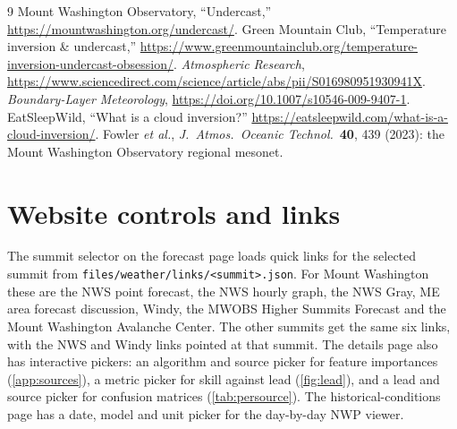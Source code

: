 \documentclass[11pt]{article}
\newcommand{\code}[1]{\texttt{#1}}
\begin{document}
\begin{thebibliography}{9}\small
{} Mount Washington Observatory, ``Undercast,'' \url{https://mountwashington.org/undercast/}.
 Green Mountain Club, ``Temperature inversion \& undercast,'' \url{https://www.greenmountainclub.org/temperature-inversion-undercast-obsession/}.
 \emph{Atmospheric Research}, \url{https://www.sciencedirect.com/science/article/abs/pii/S016980951930941X}.
 \emph{Boundary-Layer Meteorology}, \url{https://doi.org/10.1007/s10546-009-9407-1}.
 EatSleepWild, ``What is a cloud inversion?'' \url{https://eatsleepwild.com/what-is-a-cloud-inversion/}.
 Fowler \emph{et al.}, \emph{J.\ Atmos.\ Oceanic Technol.}\ \textbf{40}, 439 (2023): the Mount Washington Observatory regional mesonet.
\end{thebibliography}

\clearpage
\appendix
\sloppy
\section{Website controls and links}\label{app:links}
The summit selector on the forecast page loads quick links for the selected summit from
\code{files/weather/links/<summit>.json}. For Mount Washington these are the NWS point forecast,
the NWS hourly graph, the NWS Gray, ME area forecast discussion, Windy, the MWOBS Higher Summits
Forecast and the Mount Washington Avalanche Center. The other summits get the same six links, with the NWS and Windy
links pointed at that summit. The details page also has interactive pickers: an algorithm and source picker for
feature importances (\cref{app:sources}), a metric picker for skill against lead (\cref{fig:lead}),
and a lead and source picker for confusion matrices (\cref{tab:persource}). The historical-conditions
page has a date, model and unit picker for the day-by-day NWP viewer.

\end{document}
